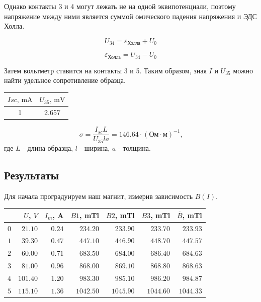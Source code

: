 \documentclass[a4paper, 12pt]{article}
\begin{document}
Однако контакты 3 и 4 могут лежать не на одной эквипотенциали, поэтому напряжение
между ними является суммой омического падения напряжения и ЭДС Холла.

\begin{equation}
    U_{34} = \varepsilon_\text{Холла} + U_0
\end{equation}

\begin{equation}
    \varepsilon_\text{Холла} = U_{34} - U_0
\end{equation}

Затем вольтметр ставится на контакты 3 и 5. Таким образом,
зная $I$ и $U_{35}$ можно найти удельное сопротивление образца.

\centering
\begin{tabular}{|c|c|}
    \toprule
    $Isc \text{, } \text{mA}$ & $U_{35} \text{, } \text{mV}$ \\
    \midrule
    1 & 2.657 \\
    \bottomrule
\end{tabular}

\begin{equation}
    \sigma =\frac{I_{sc}L}{U_{35}la} =
    146.64 \cdot (\text{Ом} \cdot \text{м})^{-1}
    \text{,}
\end{equation}
где $L$ - длина образца, $l$ - ширина, $a$ - толщина.

\subsection*{Результаты}

Для начала проградуируем наш магнит, измерив зависимость $B(I)$.

\centering
\begin{tabular}{|r|r|r|r|r|r|r|}
    \toprule
     & $U$, $V$ & $I_m$, A & $B1$, mTl & $B2$, mTl & $B3$, mTl & $\overline{B}$, mTl \\
    \midrule
    $0$ & $21.10$  & $0.24$ & $234.20$  & $233.90$  & $233.70$  & $233.93$  \\
    $1$ & $39.30$  & $0.47$ & $447.10$  & $446.90$  & $448.70$  & $447.57$  \\
    $2$ & $60.00$  & $0.71$ & $683.50$  & $684.00$  & $686.40$  & $684.63$  \\
    $3$ & $81.00$  & $0.96$ & $868.00$  & $869.10$  & $868.80$  & $868.63$  \\
    $4$ & $101.40$ & $1.20$ & $983.30$  & $985.10$  & $986.20$  & $984.87$  \\
    $5$ & $115.10$ & $1.36$ & $1042.50$ & $1045.90$ & $1044.60$ & $1044.33$ \\
    \bottomrule
\end{tabular}
\end{document}
